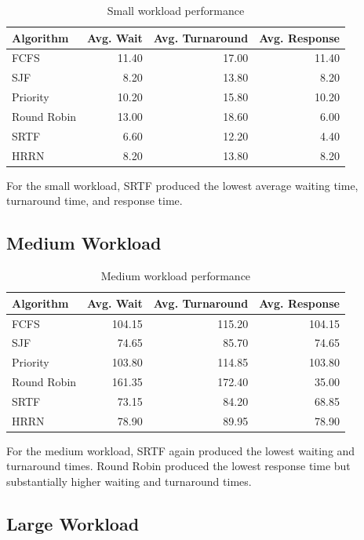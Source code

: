 \documentclass[12pt]{article}
\begin{document}
\begin{table}[H]
\centering
\caption{Small workload performance}
\begin{tabular}{lrrr}
\toprule
Algorithm & Avg. Wait & Avg. Turnaround & Avg. Response \\
\midrule
FCFS & 11.40 & 17.00 & 11.40 \\
SJF & 8.20 & 13.80 & 8.20 \\
Priority & 10.20 & 15.80 & 10.20 \\
Round Robin & 13.00 & 18.60 & 6.00 \\
SRTF & 6.60 & 12.20 & 4.40 \\
HRRN & 8.20 & 13.80 & 8.20 \\
\bottomrule
\end{tabular}
\end{table}

For the small workload, SRTF produced the lowest average waiting time,
turnaround time, and response time.

\subsection{Medium Workload}

\begin{table}[H]
\centering
\caption{Medium workload performance}
\begin{tabular}{lrrr}
\toprule
Algorithm & Avg. Wait & Avg. Turnaround & Avg. Response \\
\midrule
FCFS & 104.15 & 115.20 & 104.15 \\
SJF & 74.65 & 85.70 & 74.65 \\
Priority & 103.80 & 114.85 & 103.80 \\
Round Robin & 161.35 & 172.40 & 35.00 \\
SRTF & 73.15 & 84.20 & 68.85 \\
HRRN & 78.90 & 89.95 & 78.90 \\
\bottomrule
\end{tabular}
\end{table}

For the medium workload, SRTF again produced the lowest waiting and turnaround
times. Round Robin produced the lowest response time but substantially higher
waiting and turnaround times.

\subsection{Large Workload}
\end{document}
